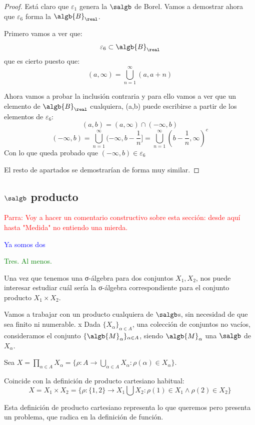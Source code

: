 \documentclass{apuntes}
\begin{document}
\begin{proof}
Está claro que $\varepsilon_1$ genera la $\salgb$ de Borel. Vamos a demostrar ahora que $\varepsilon_6$ forma la $\algb{B}_\real$.

Primero vamos a ver que:
\[\varepsilon_6 \subset \algb{B}_\real\]
que es cierto puesto que:
\[(a, \infty) = \bigcup_{n=1}^{\infty}(a,a+n)\]

Ahora vamos a probar la inclusión contraria y para ello vamos a ver que un elemento de $\algb{B}_\real$ cualquiera, (a,b) puede escribirse a partir de los elementos de $\varepsilon_6$:
\[(a,b) = (a, \infty) \cap (-\infty, b)\]
\[(-\infty, b) = \bigcup_{n=1}^{\infty}(- \infty, b - \frac{1}{n}]=\bigcup_{n=1}^{\infty}(b-\frac{1}{n}, \infty)^c\]
Con lo que queda probado que $(-\infty, b) \in \varepsilon_6$

El resto de apartados se demostrarían de forma muy similar.
\end{proof}

\subsection{$\salgb$ producto}
\textcolor{red}{Parra: Voy a hacer un comentario constructivo sobre esta sección: desde aquí hasta "Medida" no entiendo una mierda.}

\textcolor{blue}{Ya somos dos}

\textcolor{green}{Tres. Al menos.}

Una vez que tenemos una σ-álgebra para dos conjuntos $X_1, X_2$, nos puede interesar estudiar cuál sería la σ-álgebra correspondiente para el conjunto producto $X_1×X_2$.

Vamos a trabajar con un producto cualquiera de $\salgb$s, sin necesidad de que sea finito ni numerable.
x
Dada $\{X_\alpha\}_{\alpha\in A}$, una colección de conjuntos no vacíos, consideramos el conjunto $\{\algb{M}_\alpha\}_{\alpha\in A}$, siendo $\algb{M}_\alpha$ una $\salgb$ de $X_\alpha$.

Sea $X=\prod_{\alpha\in A}X_\alpha=\{\rho: A \rightarrow \bigcup_{\alpha\in A} X_\alpha : \rho(\alpha)\in X_\alpha\}$.


\obs Coincide con la definición de producto cartesiano habitual: \[X=X_1\times X_2=\{\rho: \{1,2\} \rightarrow X_1 \bigcup X_2 : \rho(1)\in X_1 \wedge \rho(2) \in X_2\}\]

Esta definición de producto cartesiano representa lo que queremos pero presenta un problema, que radica en la definición de función.
\end{document}
